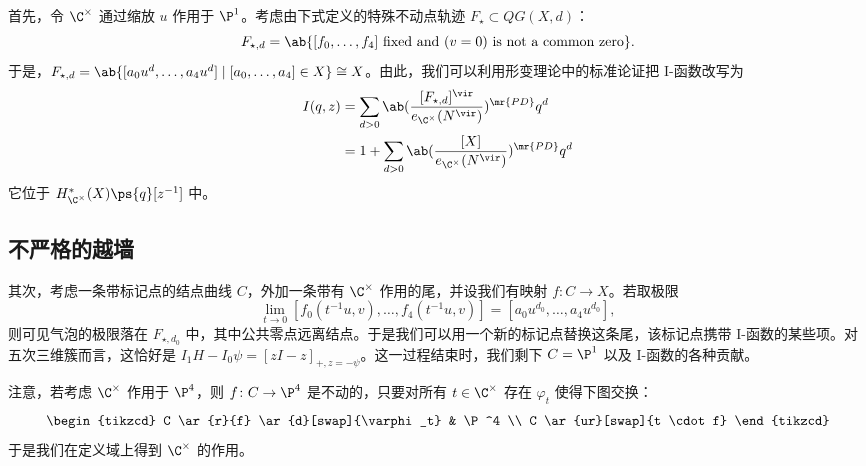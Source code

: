 首先，令 \(\C^{\times}\) 通过缩放 \(u\) 作用于 \(\P^1\)。考虑由下式定义的特殊不动点轨迹 \(F_{\star} \subset QG(X, d)\)：
\[ F_{\star,d} = \ab\{ [f_0, \ldots, f_4] \text{ fixed and } (v=0) \text{ is not a common zero} \}. \]
于是，\(F_{\star,d} = \ab\{ [a_0 u^d, \ldots, a_4 u^d] \mid [a_0, \ldots, a_4] \in X \} \cong X\)。由此，我们可以利用形变理论中的标准论证把 I-函数改写为
\begin{align*}
    I(q,z) &= \sum_{d > 0} \ab(\frac{[F_{\star, d}]^{\vir}}{e_{\C^{\times}}(N^{\vir})})^{\mr{PD}} q^d \\
    &= 1 + \sum_{d > 0} \ab( \frac{[X]}{e_{\C^{\times}}(N^{\vir})})^{\mr{PD}} q^d
\end{align*}
它位于 \(H^*_{\C^{\times}}(X) \ps{q}[z^{-1}]\) 中。

\subsection{不严格的越墙}%
\label{sub:Wall-crossing without rigor}


其次，考虑一条带标记点的结点曲线 \(C\)，外加一条带有 \(\C^{\times}\) 作用的尾，并设我们有映射 \(f \colon C \to X\)。若取极限
\[ \lim_{t \to 0} [f_0(t^{-1}u, v), \ldots, f_4(t^{-1}u, v)] = [a_0 u^{d_0}, \ldots, a_4 u^{d_0}], \]
则可见气泡的极限落在 \(F_{\star, d_0}\) 中，其中公共零点远离结点。于是我们可以用一个新的标记点替换这条尾，该标记点携带 I-函数的某些项。对五次三维簇而言，这恰好是 \(I_1 H - I_0 \psi = [zI-z]_{+, z = -\psi}\)。这一过程结束时，我们剩下 \(C = \P^1\) 以及 I-函数的各种贡献。

注意，若考虑 \(\C^{\times}\) 作用于 \(\P^4\)，则 \(f \colon C \to \P^4\) 是不动的，只要对所有 \(t \in \C^{\times}\) 存在 \(\varphi_t\) 使得下图交换：
\begin{equation*}
\begin{tikzcd}
    C \ar{r}{f} \ar{d}[swap]{\varphi_t} & \P^4 \\
    C \ar{ur}[swap]{t \cdot f}
\end{tikzcd}
\end{equation*}
于是我们在定义域上得到 \(\C^{\times}\) 的作用。

